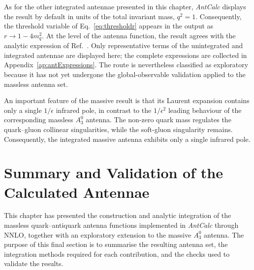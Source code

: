 As for the other integrated antennae presented in this chapter, \textit{AntCalc} displays the
result by default in units of the total invariant mass, $q^2=1$. Consequently, the threshold
variable of Eq.~\eqref{eq:thresholdr} appears in the output as $r\to1-4m_q^2$. At the level of
the antenna function, the result agrees with the analytic expression of
Ref.~\cite{GehrmannDeRidder:2009fz}. Only representative terms of the unintegrated and
integrated antennae are displayed here; the complete expressions are collected in
Appendix~\ref{ap:antExpressions}. The route is nevertheless classified as exploratory because
it has not yet undergone the global-observable validation applied to the massless antenna set.

An important feature of the massive result is that its Laurent expansion contains only a single
$1/\epsilon$ infrared pole, in contrast to the $1/\epsilon^2$ leading behaviour of the
corresponding massless $A_3^0$ antenna. The non-zero quark mass regulates the quark--gluon
collinear singularities, while the soft-gluon singularity remains. Consequently, the integrated
massive antenna exhibits only a single infrared pole.

\section{Summary and Validation of the Calculated Antennae}\label{sec:masterValidationOverview}

This chapter has presented the construction and analytic integration of the massless
quark--antiquark antenna functions implemented in \textit{AntCalc} through NNLO, together with
an exploratory extension to the massive $A_3^0$ antenna. The purpose of this final section is to
summarise the resulting antenna set, the integration methods required for each contribution, and
the checks used to validate the results.

